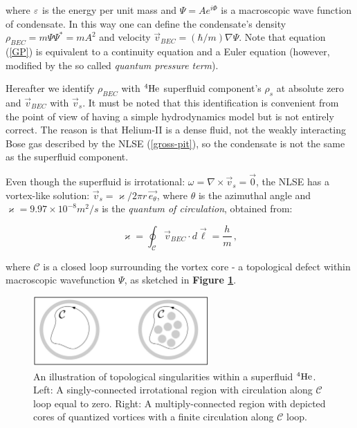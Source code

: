where $\varepsilon$ is the energy per unit mass and $\Psi = A e^{i\Phi}$ is a macroscopic wave function of condensate. In this way one can define the condensate's density $\rho_{BEC} = m\Psi\Psi^* =  mA^2$ and velocity $\vec{v}_{BEC} = (\hbar / m)\nabla \Psi$. Note that equation (\ref{GP}) is equivalent to a continuity equation and a Euler equation (however, modified by the so called \textit{quantum pressure term}).

Hereafter we identify $\rho_{BEC}$ with ${}^4\mathrm{He}$ superfluid component's $\rho_s$ at absolute zero and $\vec{v}_{BEC}$ with $\vec{v}_s$. It must be noted that this identification is convenient from the point of view of having a simple hydrodynamics model but is not entirely correct. The reason is
that Helium-II is a dense fluid, not the weakly interacting Bose gas described
by the NLSE (\ref{gross-pit}), so the condensate is not the same as the superfluid component.

\newpage

Even though the superfluid is irrotational: $\omega = \nabla \times \vec{v}_s = \vec{0}$, the NLSE has a vortex-like solution: $\vec{v}_s = \varkappa / 2\pi r\, \vec{e_{\theta}}$, where $\theta$ is the azimuthal angle and $\varkappa=9.97 \times 10^{-8} \unit{m^2/s}$ is the \textit{quantum of circulation}, obtained from:

\begin{equation}
\varkappa = \oint_{\mathcal{C}} \vec{v}_{BEC} \cdot \unit{d}\vec{\boldsymbol{\ell}} = \frac{h}{m}\,,
\label{varkappa}
\end{equation}

where $\mathcal{C}$ is a closed loop surrounding the vortex core - a topological defect within macroscopic wavefunction $\Psi$, as sketched in \textbf{Figure \ref{singularity}}.

\begin{figure}[h]
	\centering
	\includegraphics[width=0.6\textwidth]{graphics/theory/singularity}
	\caption{An illustration of topological singularities within a superfluid ${}^4\mathrm{He}$. Left: A singly-connected irrotational region with circulation along $\mathcal{C}$ loop equal to zero. Right: A multiply-connected region with depicted cores of quantized vortices with a finite circulation along $\mathcal{C}$ loop.}
	\label{singularity}
\end{figure}

